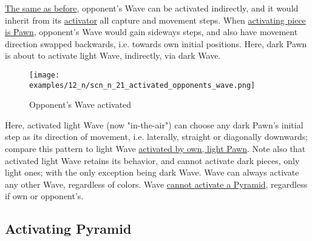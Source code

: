 \vspace*{-0.5\baselineskip}
\hyperref[fig:scn_mv_078_activating_opponents_wave]{The same as before},
opponent's Wave can be activated indirectly, and it would inherit from its
\hyperref[sec:Terms/Activator]{activator} all capture and movement steps. When
\hyperref[fig:scn_n_18_capture_pawn_init]{activating piece is Pawn}, opponent's
Wave would gain sideways steps, and also have movement direction swapped backwards,
i.e. towards own initial positions.\newline
\indent
Here, dark Pawn is about to activate light Wave, indirectly, via dark Wave.

\clearpage %

\vspace*{-2.1\baselineskip}
\noindent
\begin{figure}[!h]
\texttt{[image: examples/12\_n/scn\_n\_21\_activated\_opponents\_wave.png]}
\vspace*{-1.4\baselineskip}
\caption{Opponent's Wave activated}
\label{fig:scn_n_21_activated_opponents_wave}
\end{figure}

\vspace*{-0.5\baselineskip}
Here, activated light Wave (now "in-the-air") can choose any dark Pawn's initial
step as its direction of movement, i.e. laterally, straight or diagonally downwards;
compare this pattern to light Wave
\hyperref[fig:scn_n_19_capture_pawn_activated_wave]{activated by own, light Pawn}.\newline
\indent
Note also that activated light Wave retains its behavior, and cannot activate dark
pieces, only light ones; with the only exception being dark Wave. Wave can always
activate any other Wave, regardless of colors. Wave
\hyperref[fig:scn_mv_009_not_activating_pyramid_by_wave]{cannot activate a Pyramid},
regardless if own or opponent's.

\clearpage %

\subsection*{Activating Pyramid}
\label{sec:Nineteen/Sideways Pawns/Activating Pyramid}

